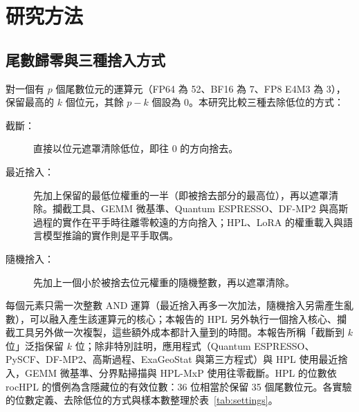 \chapter{研究方法}\label{ch:method}

\section{尾數歸零與三種捨入方式}\label{sec:rounding}

對一個有 $p$ 個尾數位元的運算元（FP64 為 52、BF16 為 7、FP8 E4M3 為 3），保留最高的 $k$ 個位元，其餘 $p-k$ 個設為 0。本研究比較三種去除低位的方式：

\begin{description}
  \item[截斷：] 直接以位元遮罩清除低位，即往 0 的方向捨去。
  \item[最近捨入：] 先加上保留的最低位權重的一半（即被捨去部分的最高位），再以遮罩清除。攔截工具、GEMM 微基準、Quantum ESPRESSO、DF-MP2 與高斯過程的實作在平手時往離零較遠的方向捨入；HPL、LoRA 的權重載入與語言模型推論的實作則是平手取偶。
  \item[隨機捨入：] 先加上一個小於被捨去位元權重的隨機整數，再以遮罩清除。
\end{description}

每個元素只需一次整數 AND 運算（最近捨入再多一次加法，隨機捨入另需產生亂數），可以融入產生該運算元的核心；本報告的 HPL 另外執行一個捨入核心、攔截工具另外做一次複製，這些額外成本都計入量到的時間。本報告所稱「截斷到 $k$ 位」泛指保留 $k$ 位；除非特別註明，應用程式（Quantum ESPRESSO、PySCF、DF-MP2、高斯過程、ExaGeoStat 與第三方程式）與 HPL 使用最近捨入，GEMM 微基準、分界點掃描與 HPL-MxP 使用往零截斷。HPL 的位數依 rocHPL 的慣例為含隱藏位的有效位數：36 位相當於保留 35 個尾數位元。各實驗的位數定義、去除低位的方式與樣本數整理於表~\ref{tab:settings}。

